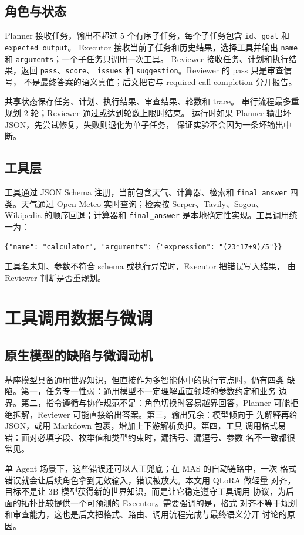 \documentclass[UTF8,a4paper,12pt]{ctexart}
\begin{document}
\subsection{角色与状态}
Planner 接收任务，输出不超过 5 个有序子任务，每个子任务包含
\texttt{id}、\texttt{goal} 和 \texttt{expected\_output}。
Executor 接收当前子任务和历史结果，选择工具并输出
\texttt{name} 和 \texttt{arguments}；一个子任务只调用一次工具。
Reviewer 接收任务、计划和执行结果，返回 \texttt{pass}、\texttt{score}、
\texttt{issues} 和 \texttt{suggestion}。Reviewer 的 pass 只是审查信号，
不是最终答案的语义真值；后文把它与 required-call completion 分开报告。

共享状态保存任务、计划、执行结果、审查结果、轮数和 trace。
串行流程最多重规划 2 轮；Reviewer 通过或达到轮数上限时结束。
运行时如果 Planner 输出坏 JSON，先尝试修复，失败则退化为单子任务，
保证实验不会因为一条坏输出中断。

\subsection{工具层}
工具通过 JSON Schema 注册，当前包含天气、计算器、检索和
\texttt{final\_answer} 四类。天气通过 Open-Meteo 实时查询；检索按
Serper、Tavily、Sogou、Wikipedia 的顺序回退；计算器和
\texttt{final\_answer} 是本地确定性实现。工具调用统一为：
\begin{lstlisting}
{"name": "calculator", "arguments": {"expression": "(23*17+9)/5"}}
\end{lstlisting}
工具名未知、参数不符合 schema 或执行异常时，Executor 把错误写入结果，
由 Reviewer 判断是否重规划。

\clearpage
\section{工具调用数据与微调}\label{sec:data}
\subsection{原生模型的缺陷与微调动机}
基座模型具备通用世界知识，但直接作为多智能体中的执行节点时，仍有四类
缺陷。第一，任务专一性弱：通用模型不一定理解垂直领域的参数约定和业务
边界。第二，指令遵循与协作规范不足：角色切换时容易越界回答，Planner
可能拒绝拆解，Reviewer 可能直接给出答案。第三，输出冗余：模型倾向于
先解释再给 JSON，或用 Markdown 包裹，增加上下游解析负担。第四，工具
调用格式易错：面对必填字段、枚举值和类型约束时，漏括号、漏逗号、参数
名不一致都很常见。

单 Agent 场景下，这些错误还可以人工兜底；在 MAS 的自动链路中，一次
格式错误就会让后续角色拿到无效输入，错误被放大。本文用 QLoRA 做轻量
对齐，目标不是让 3B 模型获得新的世界知识，而是让它稳定遵守工具调用
协议，为后面的拓扑比较提供一个可预测的 Executor。需要强调的是，格式
对齐不等于规划和审查能力，这也是后文把格式、路由、调用流程完成与最终语义分开
讨论的原因。
\end{document}
